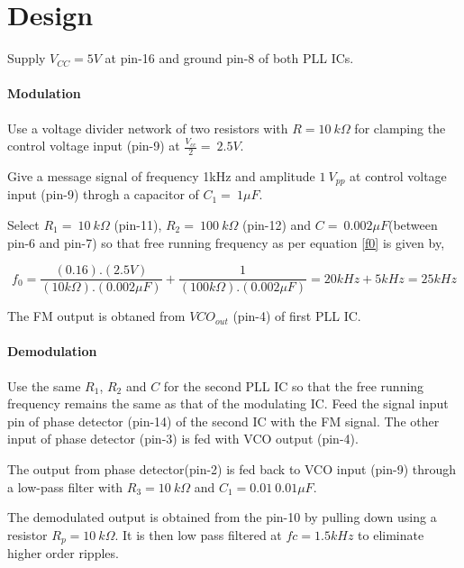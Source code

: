  
\section*{Design}

Supply $V_{CC}=5V$ at pin-16 and ground pin-8 of both  PLL ICs.

\paragraph{Modulation}


\noindent Use a voltage divider network of two resistors with $ R=10\ k\Omega$  for clamping the control voltage input (pin-9) at $\frac{V_{cc}}{2}=\ 2.5V$. 


\noindent Give a message signal of frequency 1kHz and amplitude  $1\ V_{pp}$ at control voltage input (pin-9) throgh a capacitor of $C_1=\ 1\mu F$.


\noindent Select $R_1=\ 10\ k\Omega$ (pin-11),   $R_2=\ 100\ k\Omega$ (pin-12) and $C=\  0.002 \mu F$(between pin-6 and pin-7) so that free running frequency as per equation \ref{f0} is given by,

\begin{equation}
f_0 =\frac{(0.16 ). (2.5V)}{(10k\Omega).(0.002\mu F)}+\frac{1}{(100k\Omega).(0.002\mu F)}=20 kHz+5 kHz=25 kHz
\end{equation}
 
\noindent The FM output is obtaned from $VCO_{out}$ (pin-4) of first PLL IC.

\paragraph{Demodulation}



\noindent Use the same $R_1$, $R_2$ and $C$ for the second PLL IC so that the free running frequency remains the same as that of the modulating IC. 
Feed the signal input pin of phase detector (pin-14) of the second IC with the FM signal. The other input of phase detector (pin-3) is fed with VCO output (pin-4).

\noindent The output from phase detector(pin-2)  is fed back to  VCO input (pin-9) through a low-pass filter with $R_3=10\ k\Omega$ and $C_1=0.01\ 0.01\mu F$. 

\noindent The demodulated output is obtained from the pin-10 by pulling down using a resistor $R_p=10 \ k\Omega$. It is then low pass filtered at $fc=1.5 kHz$ to eliminate higher order ripples.

